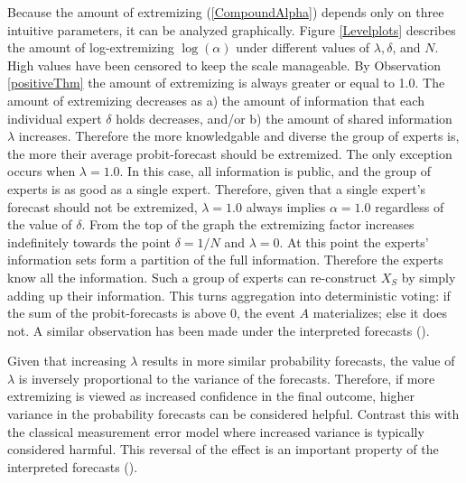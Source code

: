 \documentclass[11pt]{article}
\theoremstyle{definition}
\theoremstyle{definition}
\begin{document}
Because the amount of extremizing (\ref{CompoundAlpha}) depends only on three intuitive parameters, it can be analyzed graphically. Figure \ref{Levelplots} describes the amount of log-extremizing $\log(\alpha)$ under different values of $\lambda, \delta$, and $N$. High values have been censored to keep the scale manageable. By Observation \ref{positiveThm} the amount of extremizing is always greater or equal to 1.0. The amount of extremizing decreases as a) the amount of information that each individual expert $\delta$ holds decreases, and/or b) the amount of shared information $\lambda$ increases. Therefore the more knowledgable and diverse the group of experts is, the more their average probit-forecast should be extremized. The only exception occurs when $\lambda = 1.0$. In this case, all information is public, and the group of experts is as good as a single expert. Therefore, given that a single expert's forecast should not be extremized, $\lambda = 1.0$ always implies $\alpha = 1.0$ regardless of the value of $\delta$. From the top of the graph the extremizing factor increases indefinitely towards the point $\delta = 1/N$ and $\lambda = 0$. At this point the experts' information sets form a partition of the full information. Therefore the experts know all the information. Such a group of experts can re-construct $X_S$ by simply adding up their  information. This turns aggregation into deterministic voting: if the sum of the probit-forecasts is above 0, the event $A$ materializes; else it does not. A similar observation has been made under the interpreted forecasts (\cite{hong2009interpreted}). 

 




Given that increasing $\lambda$ results in more similar probability forecasts, the value of $\lambda$ is inversely proportional to the variance of the forecasts. Therefore, if more extremizing is viewed as increased confidence in the final outcome, higher variance in the probability forecasts can be considered helpful. Contrast this with the classical measurement error model where increased variance is typically considered harmful. This reversal of the effect is an important property of the interpreted forecasts (\cite{hong2009interpreted}). 
\end{document}
